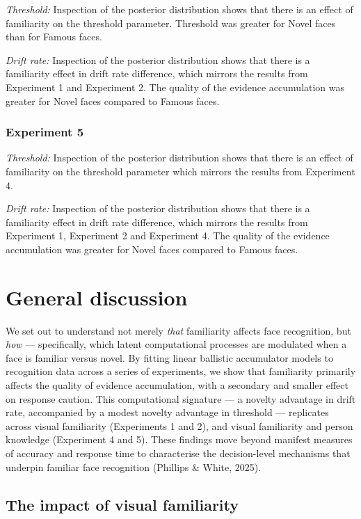 \documentclass[
  letterpaper,
  DIV=11,
  numbers=noendperiod]{scrartcl}
\begin{document}
\emph{Threshold:} Inspection of the posterior distribution shows that
there is an effect of familiarity on the threshold parameter. Threshold
was greater for Novel faces than for Famous faces.

\emph{Drift rate:} Inspection of the posterior distribution shows that
there is a familiarity effect in drift rate difference, which mirrors
the results from Experiment 1 and Experiment 2. The quality of the
evidence accumulation was greater for Novel faces compared to Famous
faces.

\subsubsection{Experiment 5}\label{experiment-5}

\emph{Threshold:} Inspection of the posterior distribution shows that
there is an effect of familiarity on the threshold parameter which
mirrors the results from Experiment 4.

\emph{Drift rate:} Inspection of the posterior distribution shows that
there is a familiarity effect in drift rate difference, which mirrors
the results from Experiment 1, Experiment 2 and Experiment 4. The
quality of the evidence accumulation was greater for Novel faces
compared to Famous faces.

\section{General discussion}\label{general-discussion}

We set out to understand not merely \emph{that} familiarity affects face
recognition, but \emph{how} --- specifically, which latent computational
processes are modulated when a face is familiar versus novel. By fitting
linear ballistic accumulator models to recognition data across a series
of experiments, we show that familiarity primarily affects the quality
of evidence accumulation, with a secondary and smaller effect on
response caution. This computational signature --- a novelty advantage
in drift rate, accompanied by a modest novelty advantage in threshold
--- replicates across visual familiarity (Experiments 1 and 2), and
visual familiarity and person knowledge (Experiment 4 and 5). These
findings move beyond manifest measures of accuracy and response time to
characterise the decision-level mechanisms that underpin familiar face
recognition (Phillips \& White, 2025).

\subsection{The impact of visual
familiarity}\label{the-impact-of-visual-familiarity}
\end{document}
